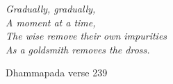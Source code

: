 \cleartorecto
\thispagestyle{empty}

\mbox{}\vfill

\hspace*{5mm}%
\begin{minipage}{\linewidth - 10mm}%
\setlength{\parskip}{5pt}%
\raggedright
\itshape
Gradually, gradually,\\
A moment at a time,\\
The wise remove their own impurities\\
As a goldsmith removes the dross.

Dhammapada verse 239
\end{minipage}

\vfill\mbox{}